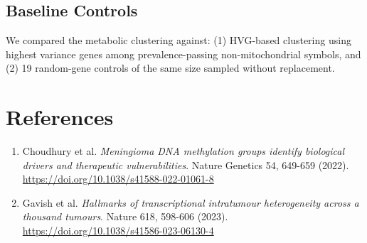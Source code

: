 \documentclass[12pt]{article}
\begin{document}
\subsection*{Baseline Controls}

We compared the metabolic clustering against: (1) HVG-based clustering using highest variance genes among prevalence-passing non-mitochondrial symbols, and (2) 19 random-gene controls of the same size sampled without replacement.

\section*{References}

\begin{enumerate}
    \item Choudhury et al. \textit{Meningioma DNA methylation groups identify biological drivers and therapeutic vulnerabilities}. Nature Genetics 54, 649-659 (2022). \url{https://doi.org/10.1038/s41588-022-01061-8}
    \item Gavish et al. \textit{Hallmarks of transcriptional intratumour heterogeneity across a thousand tumours}. Nature 618, 598-606 (2023). \url{https://doi.org/10.1038/s41586-023-06130-4}
\end{enumerate}
\end{document}
